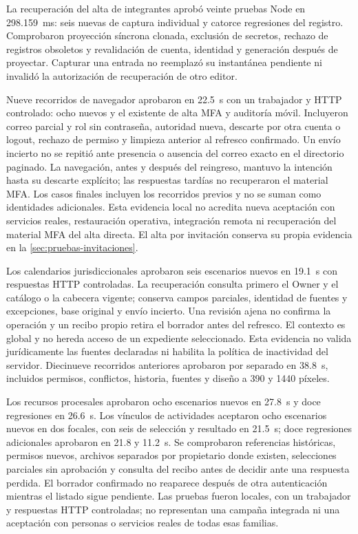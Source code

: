 La recuperación del alta de integrantes aprobó veinte pruebas Node en
298.159~ms: seis nuevas de captura individual y catorce regresiones del
registro. Comprobaron proyección síncrona clonada, exclusión de secretos,
rechazo de registros obsoletos y revalidación de cuenta, identidad y generación
después de proyectar. Capturar una entrada no reemplazó su instantánea pendiente
ni invalidó la autorización de recuperación de otro editor.

Nueve recorridos de navegador aprobaron en 22.5~s con un trabajador y HTTP
controlado: ocho nuevos y el existente de alta MFA y auditoría móvil. Incluyeron
correo parcial y rol sin contraseña, autoridad nueva, descarte por otra cuenta
o logout, rechazo de permiso y limpieza anterior al refresco confirmado. Un
envío incierto no se repitió ante presencia o ausencia del correo exacto en el
directorio paginado. La navegación, antes y después del reingreso, mantuvo la
intención hasta su descarte explícito; las respuestas tardías no recuperaron
el material MFA. Los casos finales incluyen los recorridos previos y no se
suman como identidades adicionales. Esta evidencia local no acredita nueva
aceptación con servicios reales, restauración operativa, integración remota ni
recuperaci\'on del material MFA del alta directa. El alta por invitaci\'on
conserva su propia evidencia en la \cref{sec:pruebas-invitaciones}.

Los calendarios jurisdiccionales aprobaron seis escenarios nuevos en 19.1~s
con respuestas HTTP controladas. La recuperación consulta primero el Owner
y el catálogo o la cabecera vigente; conserva campos parciales, identidad de
fuentes y excepciones, base original y envío incierto. Una revisión ajena no
confirma la operación y un recibo propio retira el borrador antes del refresco.
El contexto es global y no hereda acceso de un expediente seleccionado.
Esta evidencia no valida jurídicamente las fuentes declaradas ni habilita
la política de inactividad del servidor.
Diecinueve recorridos anteriores aprobaron por separado en 38.8~s, incluidos
permisos, conflictos, historia, fuentes y diseño a 390 y 1440 píxeles.

Los recursos procesales aprobaron ocho escenarios nuevos en 27.8~s y doce
regresiones en 26.6~s. Los vínculos de actividades aceptaron ocho escenarios
nuevos en dos focales, con seis de selección y resultado en 21.5~s; doce
regresiones adicionales aprobaron en 21.8 y 11.2~s. Se comprobaron referencias
históricas, permisos nuevos, archivos separados por propietario donde existen,
selecciones parciales sin aprobación y consulta del recibo antes de decidir
ante una respuesta perdida. El borrador confirmado no reaparece después de
otra autenticación mientras el listado sigue pendiente. Las pruebas fueron
locales, con un trabajador y respuestas HTTP controladas; no representan una
campaña integrada ni una aceptación con personas o servicios reales de todas
esas familias.

